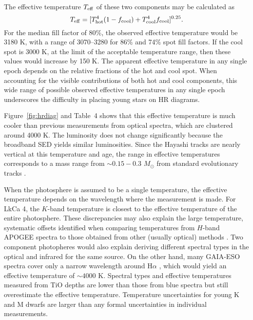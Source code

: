 \documentclass[twocolumn]{emulateapj}%
\begin{document}
The effective temperature $T_{\rm eff}$ of these two components may be calculated as
\begin{equation}
T_{\rm eff}=[T_{\rm hot}^4(1-f_{\mathrm{cool}})+T_{\mathrm{cool}}^4 f_{\mathrm{cool}}]^{0.25}.
\end{equation}
For the median fill factor of 80\%, the observed effective temperature would be 3180 K, with a range of 3070--3280 for 86\% and 74\% spot fill factors.  If the cool spot is 3000 K, at the limit of the acceptable temperature range, then these values would increase by 150 K.  The apparent effective temperature in any single epoch depends on the relative fractions of the hot and cool spot.  When accounting for the visible contributions of both hot and cool components, this wide range of possible observed effective temperatures in any single epoch underscores the difficulty in placing young stars on HR diagrams.  

Figure~\ref{fig:hrdiag} and Table~4 shows that this effective temperature is much cooler than previous measurements from optical spectra, which are clustered around 4000 K.  The luminosity does not change significantly because the broadband SED yields similar luminosities.
Since the Hayashi tracks are nearly vertical at this temperature and age, the range in effective temperatures corresponds to a mass range from $\sim 0.15-0.3$ $M_\odot$ from standard evolutionary tracks \citep{baraffe15}. 

When the photosphere is assumed to be a single temperature, the effective temperature depends on the wavelength where the measurement is made.  For LkCa 4, the $K$-band temperature  is closest to the effective temperature of the entire photosphere.  These discrepancies may also explain the large temperature, systematic offsets identified when comparing temperatures from $H$-band APOGEE spectra to those obtained from other (usually optical) methods \citep{cottaar14}.  Two component photopheres would also explain deriving different spectral types in the optical and infrared for the same source.
On the other hand, many GAIA-ESO spectra cover only a narrow wavelength around H$\alpha$ \citep[e.g.][]{jeffries14,frasca15}, which would yield an effective temperature of $\sim 4000$ K.   Spectral types and effective temperatures measured from TiO depths \citep{herczeg14} are lower than those from blue spectra but still overestimate the effective temperature.  Temperature uncertainties for young K and M dwarfs are larger than any formal uncertainties in individual measurements.
\end{document}
